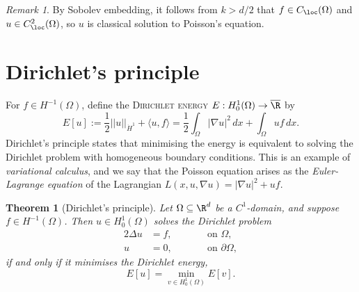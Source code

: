 \documentclass[reqno]{amsart}
\newtheorem{theorem}{Theorem}
\theoremstyle{definition}
\theoremstyle{remark}
\newtheorem*{remark}{Remark}
\renewcommand{\emph}{\textsc}
\begin{document}
\begin{remark}
	By Sobolev embedding, it follows from $k > d/2$ that $f \in C_{\loc} (\Omega)$ and $u \in C^2_{\loc} (\Omega)$, so $u$ is classical solution to Poisson's equation. 
\end{remark}

\section{Dirichlet's principle}

For $f \in H^{-1} (\Omega)$, define the \emph{Dirichlet energy} $E : H^1_0 (\Omega) \to \overline \R$ by 
	\[ E[u] := \frac12 ||u||_{\dot H^1} + \langle u, f \rangle = \frac12 \int_\Omega |\nabla u|^2 \, dx + \int_\Omega u f \, dx. \]
Dirichlet's principle states that minimising the energy is equivalent to solving the Dirichlet problem with homogeneous boundary conditions. This is an example of \textit{variational calculus}, and we say that the Poisson equation arises as the \textit{Euler-Lagrange equation} of the Lagrangian $L(x, u, \nabla u) = |\nabla u|^2 + u f$. 

\begin{theorem}[Dirichlet's principle]
	Let $\Omega \subseteq \R^d$ be a $C^1$-domain, and suppose $f \in H^{-1} (\Omega)$. Then $u \in H^1_0 (\Omega)$ solves the Dirichlet problem	
		\begin{alignat*}{2}
		\Delta u
			&= f, \qquad  && \text{on } \Omega, \\
		u
			&= 0,					\qquad && \text{on } \partial \Omega,
	\end{alignat*} 
	if and only if it minimises the Dirichlet energy, 
		\[ E[u] = \min_{v \in H^1_0 (\Omega)} E[v].  \]
\end{theorem}	
\end{document}
